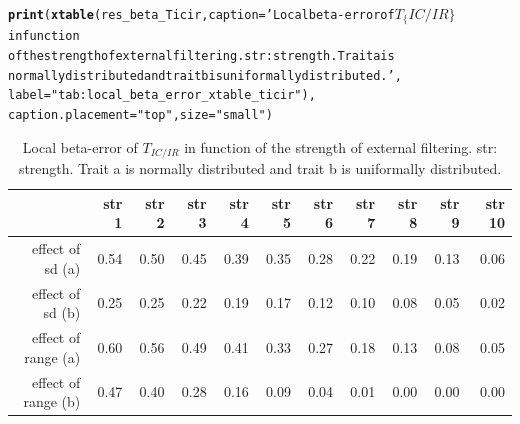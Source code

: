 \documentclass[12pt]{article}\usepackage[]{graphicx}\usepackage[]{color}
\makeatletter
\newcommand{\hlstr}[1]{\textcolor[rgb]{0.192,0.494,0.8}{#1}}%
\newcommand{\hlstd}[1]{\textcolor[rgb]{0.345,0.345,0.345}{#1}}%
\newcommand{\hlkwc}[1]{\textcolor[rgb]{0.333,0.667,0.333}{#1}}%
\newcommand{\hlkwd}[1]{\textcolor[rgb]{0.737,0.353,0.396}{\textbf{#1}}}%
\newenvironment{kframe}{%
 \def\at@end@of@kframe{}%
 \ifinner\ifhmode%
  \def\at@end@of@kframe{\end{minipage}}%
  \begin{minipage}{\columnwidth}%
 \fi\fi%
 \def\FrameCommand##1{\hskip\@totalleftmargin \hskip-\fboxsep
 \colorbox{shadecolor}{##1}\hskip-\fboxsep
     \hskip-\linewidth \hskip-\@totalleftmargin \hskip\columnwidth}%
 \MakeFramed {\advance\hsize-\width
   \@totalleftmargin\z@ \linewidth\hsize
   \@setminipage}}%
 {\par\unskip\endMakeFramed%
 \at@end@of@kframe}
\makeatother
\begin{document}
\begin{kframe}
\begin{alltt}
\hlkwd{print}\hlstd{(}\hlkwd{xtable}\hlstd{(res_beta_Ticir,} \hlkwc{caption} \hlstd{=} \hlstr{'Local beta-error of $T_\{IC/IR\}$ in function 
             of the strength of external filtering. str: strength. Trait a is 
             normally distributed and trait b is uniformally distributed.'}\hlstd{,}
             \hlkwc{label} \hlstd{=} \hlstr{"tab:local_beta_error_xtable_ticir"}\hlstd{),}
      \hlkwc{caption.placement} \hlstd{=} \hlstr{"top"}\hlstd{,} \hlkwc{size} \hlstd{=} \hlstr{"small"}\hlstd{)}
\end{alltt}
\end{kframe}%
\begin{table}[ht]
\centering
\caption{Local beta-error of $T_{IC/IR}$ in function 
             of the strength of external filtering. str: strength. Trait a is 
             normally distributed and trait b is uniformally distributed.} 
\label{tab:local_beta_error_xtable_ticir}
{\small
\begin{tabular}{rrrrrrrrrrr}
  \hline
 & str 1 & str 2 & str 3 & str 4 & str 5 & str 6 & str 7 & str 8 & str 9 & str 10 \\ 
  \hline
effect of sd (a) & 0.54 & 0.50 & 0.45 & 0.39 & 0.35 & 0.28 & 0.22 & 0.19 & 0.13 & 0.06 \\ 
  effect of sd (b) & 0.25 & 0.25 & 0.22 & 0.19 & 0.17 & 0.12 & 0.10 & 0.08 & 0.05 & 0.02 \\ 
  effect of range (a) & 0.60 & 0.56 & 0.49 & 0.41 & 0.33 & 0.27 & 0.18 & 0.13 & 0.08 & 0.05 \\ 
  effect of range (b) & 0.47 & 0.40 & 0.28 & 0.16 & 0.09 & 0.04 & 0.01 & 0.00 & 0.00 & 0.00 \\ 
   \hline
\end{tabular}
}
\end{table}
\end{document}
